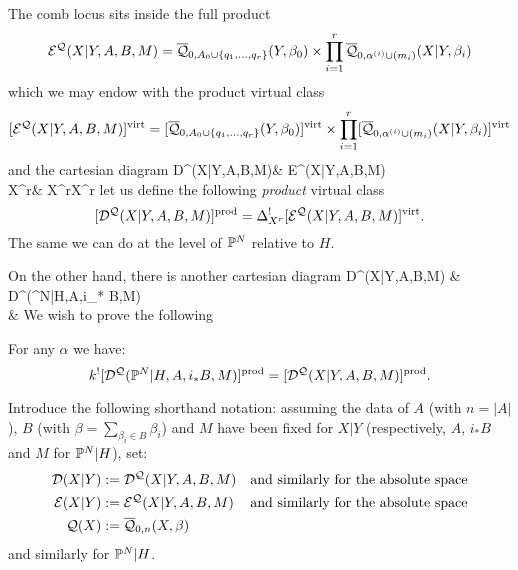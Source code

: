 The comb locus sits inside the full product
\begin{equation*} \mathcal E^{\mathcal{Q}}(X|Y,A,B,M) = \overline{\mathcal Q}_{0,A_0 \cup \{q_1, \ldots, q_r\}}(Y,\beta_0) \times \prod_{i=1}^r \overline{\mathcal Q}_{0,\alpha^{(i)}\cup (m_i)}(X|Y,\beta_i) \end{equation*}
which we may endow with the product virtual class
\begin{equation*} [\mathcal E^{\mathcal{Q}}(X|Y,A,B,M)]^{\operatorname{virt}} = [\overline{\mathcal Q}_{0,A_0 \cup \{q_1, \ldots, q_r\}}(Y,\beta_0)]^{\operatorname{virt}} \times \prod_{i=1}^r [\overline{\mathcal Q}_{0,\alpha^{(i)}\cup (m_i)}(X|Y,\beta_i)]^{\operatorname{virt}} \end{equation*}
and the cartesian diagram
\bcd
\mathcal D^{}(X|Y,A,B,M)\ar[r]\ar[d] & \mathcal E^{}(X|Y,A,B,M)\ar[d] \\
X^r\ar[r,"\Delta_{X^r}"] & X^r\times X^r
\ecd
let us define the following \emph{product} virtual class
\[
 [\mathcal D^{\mathcal{Q}}(X|Y,A,B,M)]^{\operatorname{prod}}=\Delta_{X^r}^![\mathcal E^{\mathcal{Q}}(X|Y,A,B,M)]^{\operatorname{virt}}.
\]
The same we can do at the level of $\mathbb P^N$ relative to $H$.

On the other hand, there is another cartesian diagram
\bcd
\mathcal D^(X|Y,A,B,M) \ar[r,"k_{|D}"] \ar[d]  & \mathcal D^(\PP^N|H,A,i_* B,M) \ar[d] \\
 \ar[r,"k"] & 
\ecd
We wish to prove the following
\begin{lem} \label{Comb loci pull back} For any $\alpha$ we have:
\begin{equation*} k^! [\mathcal D^\mathcal{Q}(\mathbb P^N|H,A,i_*B,M)]^{\operatorname{prod}} = [\mathcal D^\mathcal{Q}(X|Y,A,B,M)]^{\operatorname{prod}}. \end{equation*} \end{lem}

Introduce the following shorthand notation: assuming the data of $A$ (with $n=\lvert A\rvert$), $B$ (with $\beta=\sum_{\beta_i\in B} \beta_i$) and $M$ have been fixed for $X|Y$ (respectively, $A$, $i_*B$ and $M$ for $\mathbb P^N|H$), set:
\begin{align*}
\mathcal{D}(X|Y) & := \mathcal D^{\mathcal{Q}}(X|Y,A,B,M) & \text{and similarly for the absolute space} \\
\mathcal{E}(X|Y) & := \mathcal E^{\mathcal{Q}}(X|Y,A,B,M) & \text{and similarly for the absolute space} \\
\mathcal{Q}(X) & :=\overline{\mathcal Q}_{0,n}(X,\beta)
\end{align*}
and similarly for $\mathbb P^N|H$.


